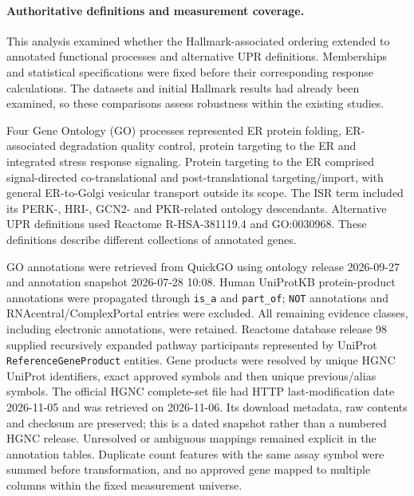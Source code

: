 \documentclass[a4paper,fleqn]{cas-sc}
\makeatletter
\DeclareRobustCommand{\rev}[1]{{\color{red}\def\@citecolor{black}\def\@linkcolor{red}\def\@urlcolor{red}#1}}
\let\unmarkedcite\cite
\renewcommand{\cite}[1]{{\color{black}\def\@citecolor{black}\unmarkedcite{#1}}}
\makeatother
\begin{document}
\paragraph{\rev{Authoritative definitions and measurement coverage.}}
\rev{This analysis examined whether the Hallmark-associated ordering extended to annotated functional processes and alternative UPR definitions.} \rev{Memberships and statistical specifications were fixed before their corresponding response calculations.} \rev{The datasets and initial Hallmark results had already been examined, so these comparisons assess robustness within the existing studies.}

\rev{Four Gene Ontology (GO) processes represented ER protein folding, ER-associated degradation quality control, protein targeting to the ER and integrated stress response signaling.\cite{go2000,go2026}} \rev{Protein targeting to the ER comprised signal-directed co-translational and post-translational targeting/import, with general ER-to-Golgi vesicular transport outside its scope.} \rev{The ISR term included its PERK-, HRI-, GCN2- and PKR-related ontology descendants.} \rev{Alternative UPR definitions used Reactome R-HSA-381119.4 and GO:0030968.\cite{reactome2024}} \rev{These definitions describe different collections of annotated genes.}

\rev{GO annotations were retrieved from QuickGO using ontology release 2026-09-27 and annotation snapshot 2026-07-28 10:08.} \rev{Human UniProtKB protein-product annotations were propagated through \texttt{is\_a} and \texttt{part\_of}; \texttt{NOT} annotations and RNAcentral/ComplexPortal entries were excluded.} \rev{All remaining evidence classes, including electronic annotations, were retained.} \rev{Reactome database release 98 supplied recursively expanded pathway participants represented by UniProt \texttt{ReferenceGeneProduct} entities.} \rev{Gene products were resolved by unique HGNC UniProt identifiers, exact approved symbols and then unique previous/alias symbols.} \rev{The official HGNC complete-set file had HTTP last-modification date 2026-11-05 and was retrieved on 2026-11-06.} \rev{Its download metadata, raw contents and checksum are preserved; this is a dated snapshot rather than a numbered HGNC release.} \rev{Unresolved or ambiguous mappings remained explicit in the annotation tables.} \rev{Duplicate count features with the same assay symbol were summed before transformation, and no approved gene mapped to multiple columns within the fixed measurement universe.}
\end{document}
